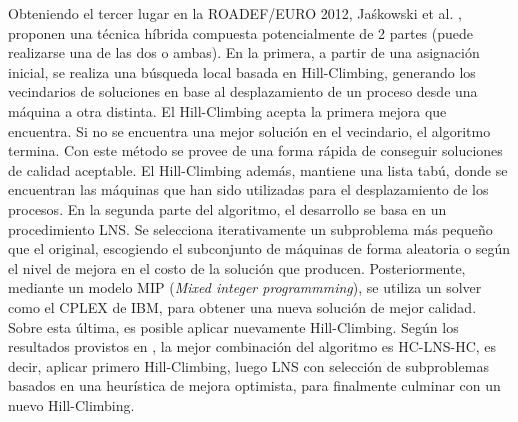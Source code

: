Obteniendo el tercer lugar en la ROADEF/EURO 2012, Jaśkowski et al. \cite{jaskowskihybrid}, proponen una técnica híbrida compuesta potencialmente de 2 partes (puede realizarse una de las dos o ambas). En la primera, a partir de una asignación inicial, se realiza una búsqueda local basada en Hill-Climbing, generando los vecindarios de soluciones en base al desplazamiento de un proceso desde una máquina a otra distinta. El Hill-Climbing acepta la primera mejora que encuentra. Si no se encuentra una mejor solución en el vecindario, el algoritmo termina. Con este método se provee de una forma rápida de conseguir soluciones de calidad aceptable. El Hill-Climbing además, mantiene una lista tabú, donde se encuentran las máquinas que han sido utilizadas para el desplazamiento de los procesos. En la segunda parte del algoritmo, el desarrollo se basa en un procedimiento LNS. Se selecciona iterativamente un subproblema más pequeño que el original, escogiendo el subconjunto de máquinas de forma aleatoria o según el nivel de mejora en el costo de la solución que producen. Posteriormente, mediante un modelo MIP (\emph{Mixed integer programmming}), se utiliza un solver como el CPLEX de IBM, para obtener una nueva solución de mejor calidad. Sobre esta última, es posible aplicar nuevamente Hill-Climbing. Según los resultados provistos en \cite{jaskowskihybrid}, la mejor combinación del algoritmo es HC-LNS-HC, es decir, aplicar primero Hill-Climbing, luego LNS con selección de subproblemas basados en una heurística de mejora optimista, para finalmente culminar con un nuevo Hill-Climbing. \\

